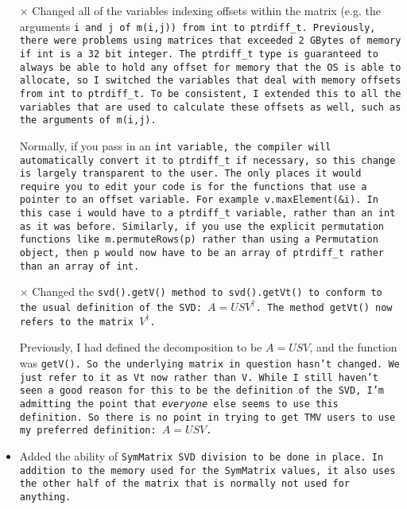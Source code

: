 \begin{itemize}
\item[$\times$]
Changed all of the variables indexing offsets within the matrix (e.g. the arguments \tt{i} and \tt{j} of \tt{m(i,j)}) from \tt{int} to \tt{ptrdiff\_t}.  Previously, there were problems using matrices that exceeded 2 GBytes of memory if \tt{int} is a 32 bit integer.  The \tt{ptrdiff\_t} type is guaranteed to always be able to hold any offset for memory that the OS is able to allocate, so I switched the variables that deal with memory offsets from \tt{int} to \tt{ptrdiff\_t}.  To be consistent, I extended this to all the variables that are used to calculate these offsets as well, such as the arguments of \tt{m(i,j)}.

Normally, if you pass in an \tt{int} variable, the compiler will automatically convert it to \tt{ptrdiff\_t} if necessary, so this change is largely transparent to the user. The only places it would require you to edit your code is for the functions that use a pointer to an offset variable.  For example \tt{v.maxElement(&i)}.  In this case \tt{i} would have to a \tt{ptrdiff\_t} variable, rather than an \tt{int} as it was before.  Similarly, if you use the explicit permutation functions like \tt{m.permuteRows(p)} rather than using a \tt{Permutation} object, then \tt{p} would now have to be an array of \tt{ptrdiff\_t} rather than an array of \tt{int}.

\item[$\times$]
Changed the \tt{svd().getV()} method to \tt{svd().getVt()} to conform to the
usual definition of the SVD: $A = U S V^\dagger$.  The method \tt{getVt()} now refers to the matrix $V^\dagger$.  

Previously, I had defined the decomposition to be $A = U S V$, and the function was \tt{getV()}.  So the underlying matrix in question hasn't changed.  We just refer to it as \tt{Vt} now rather than
\tt{V}.  While I still haven't seen a good reason for this to be the 
definition of the SVD, I'm admitting the point that {\em everyone} else
seems to use this definition.  So there is no point in trying to get TMV users
to use my preferred definition: $A = U S V$.

\item
Added the ability of \tt{SymMatrix} SVD division to be done in place.
In addition to the memory used for the \tt{SymMatrix} values, it also uses 
the other half of the matrix that is normally not used for anything.


\end{itemize}
